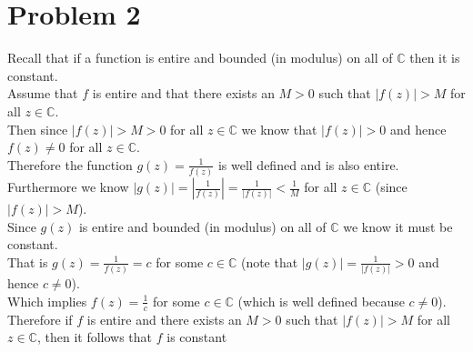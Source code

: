 \documentclass{article}
\begin{document}
\section*{Problem 2}
\begin{center}
    \doublespacing
    Recall that if a function is entire and bounded (in modulus) on all of $\mathbb{C}$ then it is constant.
    \break
    \\Assume that $f$ is entire and that there exists an $M > 0$ such that $|f(z)| > M$ for all $z\in\mathbb{C}$.
    \\Then since $|f(z)| > M > 0$ for all $z\in\mathbb{C}$ we know that $|f(z)| > 0$ and hence $f(z)\neq 0$ for all $z\in\mathbb{C}$.
    \\Therefore the function $g(z) =\frac{1}{f(z)}$ is well defined and is also entire.
    \\Furthermore we know $|g(z)| = |\frac{1}{f(z)}| =\frac{1}{|f(z)|} <\frac{1}{M}$ for all $z\in\mathbb{C}$ (since $|f(z)| > M$).
    \break
    \\Since $g(z)$ is entire and bounded (in modulus) on all of $\mathbb{C}$ we know it must be constant.
    \\That is $g(z) =\frac{1}{f(z)} = c$ for some $c\in\mathbb{C}$ (note that $|g(z)| =\frac{1}{|f(z)|} > 0$ and hence $c\neq 0$).
    \\Which implies $f(z) =\frac{1}{c}$ for some $c\in\mathbb{C}$ (which is well defined because $c\neq 0$).
    \break
    \\Therefore if $f$ is entire and there exists an $M > 0$ such that $|f(z)| > M$ for all $z\in\mathbb{C}$, then it follows that $f$ is constant \qedsymbol
\end{center}
\end{document}
